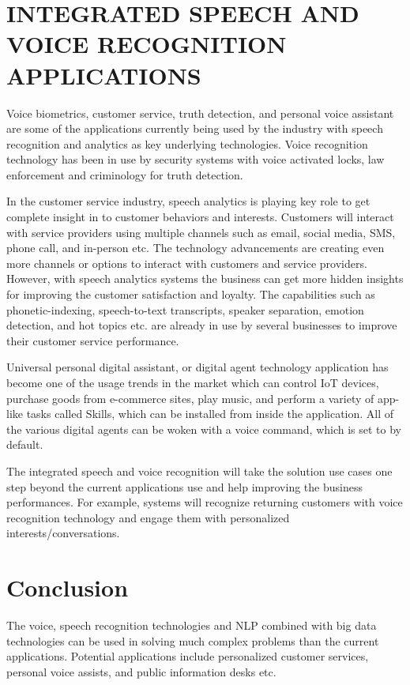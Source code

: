 \documentclass[sigconf]{acmart}
\begin{document}
\section{INTEGRATED SPEECH AND VOICE RECOGNITION APPLICATIONS}
Voice biometrics, customer service, truth detection, and personal voice assistant are some of the applications currently being used by the industry with speech recognition and analytics as key underlying technologies. Voice recognition technology has been in use by security systems with voice activated locks, law enforcement and criminology for truth detection. 

In the customer service industry, speech analytics is playing key role to get complete insight in to customer behaviors and interests. Customers will interact with service providers using multiple channels such as email, social media, SMS, phone call, and in-person etc. The technology advancements are creating even more channels or options to interact with customers and service providers.  However, with speech analytics systems the business can get more hidden insights for improving the customer satisfaction and loyalty. The capabilities such as phonetic-indexing, speech-to-text transcripts, speaker separation, emotion detection, and hot topics etc. are already in use by several businesses to improve their customer service performance.

Universal personal digital assistant, or digital agent technology application has become one of the usage trends in the market which  can control IoT devices, purchase goods from e-commerce sites, play music, and perform a variety of app-like tasks called Skills, which can be installed from inside the application. All of the various digital agents can be woken with a voice command, which is set to by default.

The integrated speech and voice recognition will take the solution use cases one step beyond the current applications use and help improving the business performances. For example, systems will recognize returning customers with voice recognition technology and engage them with personalized interests/conversations. 

\section{Conclusion}
 The voice, speech recognition technologies and NLP combined with big data technologies can be used in solving much complex problems than the current applications. Potential applications include personalized customer services, personal voice assists, and public information desks etc. 
 
\end{document}
